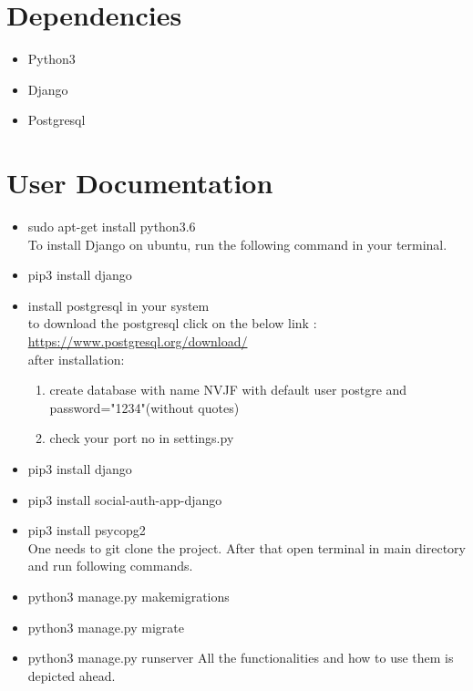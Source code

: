 \documentclass[a4paper 12pt]{article}
\begin{document}
\newpage
\section{\textbf{Dependencies}}
\begin{itemize}
\item Python3
\item Django
\item Postgresql


\end{itemize}


\newpage
\section{\textbf{User Documentation}}
\begin{itemize}
\item sudo apt-get install python3.6\\
To install Django on ubuntu, run the following command in your terminal.
\item pip3 install django\\

\item install postgresql in your system\\
to download the postgresql click on the below link : \\
\href{https://www.postgresql.org/download/}{https://www.postgresql.org/download/}\\
after installation:\\
\begin{enumerate}
    \item create database with name NVJF with default user postgre and password="1234"(without quotes)
    \item check your port no in settings.py
\end{enumerate}
\item pip3 install django
\item pip3 install social-auth-app-django
\item pip3 install psycopg2 \\ 
One needs to git clone the project. After that open terminal in main directory and run following commands.
\item python3 manage.py makemigrations
\item python3 manage.py migrate
\item python3 manage.py runserver
All the functionalities and how to use them is depicted ahead.

\end{itemize}
\end{document}
